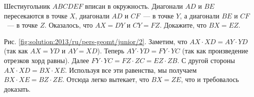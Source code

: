 \problem
Шестиугольник $ABCDEF$ вписан в окружность.
Диагонали $AD$ и $BE$ пересекаются в точке $X$, диагонали $AD$ и $CF$~--- в
точке $Y$, а диагонали $BE$ и $CF$~--- в точке $Z$.
Оказалось, что $AX = DY$ и $CY = FZ$.
Докажите, что $BX = EZ$.

%
\label{solution:2013/ru/pers-geomt/junior/2}
Рис. \ref{fig:solution:2013/ru/pers-geomt/junior/2}.
Заметим, что $AX \cdot XD = AY \cdot YD$ (так как $AX=YD$ и $AY=XD$).
Теперь $AY \cdot YD = FY \cdot YC$ (так как произведение отрезков хорд равны).
Далее $FY \cdot YC = FZ \cdot ZC = EZ \cdot ZB$.
С другой стороны $AX \cdot XD = BX \cdot XE$.
Используя все эти равенства, мы получаем $BX \cdot XE = BZ \cdot ZE$.
Отсюда легко вытекает, что $BX = ZE$, что и требовалось доказать.
\endproblem
